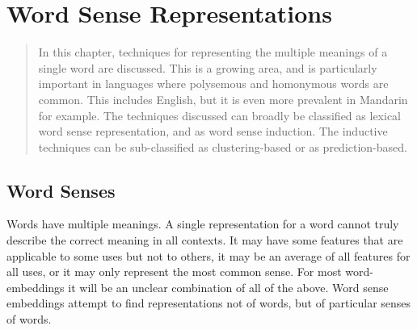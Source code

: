 \documentclass[12pt,parskip]{komatufte}
\begin{document}

\chapter{Word Sense Representations}\label{sec:word sense-representations}
\begin{abstract}
	In this chapter, techniques for representing the multiple meanings of a single word are discussed.
	This is a growing area, and is particularly important in languages where polysemous and homonymous words are common.
	This includes English, but it is even more prevalent in Mandarin for example.
	The techniques discussed can broadly be classified as lexical word sense representation,  and as word sense induction.
	The inductive techniques can be sub-classified as clustering-based or as prediction-based.
\end{abstract}
	
\section{Word Senses}

Words have multiple meanings.
A single representation for a word cannot truly describe the correct meaning in all contexts.
It may have some features that are applicable to some uses but not to others,
it may be an average of all features for all uses,
or it may only represent the most common sense.
For most word-embeddings it will be an unclear combination of all of the above.
Word sense embeddings attempt to find representations not of words, but of particular senses of words.
\end{document}
